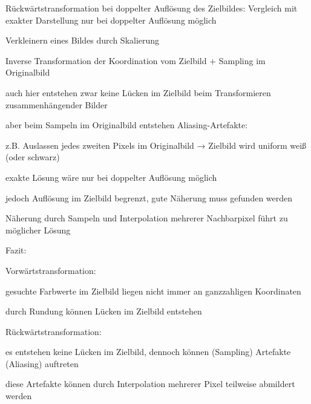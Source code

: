 \documentclass[landscape]{article}
\begin{document}
\begin{multicols}{3}
  
  Rückwärtstransformation bei doppelter Auflösung des Zielbildes: Vergleich mit exakter Darstellung nur bei doppelter Auflösung möglich
  
  Verkleinern eines Bildes durch Skalierung
  \begin{itemize*}
    \item Inverse Transformation der Koordination vom Zielbild + Sampling im Originalbild
          \begin{itemize*}
            \item auch hier entstehen zwar keine Lücken im Zielbild beim Transformieren zusammenhängender Bilder
            \item aber beim Sampeln im Originalbild entstehen Aliasing-Artefakte:
            \item z.B. Auslassen jedes zweiten Pixels im Originalbild → Zielbild wird uniform weiß (oder schwarz)
          \end{itemize*}
    \item exakte Lösung wäre nur bei doppelter Auflösung möglich
    \item jedoch Auflösung im Zielbild begrenzt, gute Näherung muss gefunden werden
    \item Näherung durch Sampeln und Interpolation mehrerer Nachbarpixel führt zu möglicher Lösung
  \end{itemize*}
  
  
  Fazit:
  \begin{itemize*}
    \item Vorwärtstransformation:
          \begin{itemize*}
            \item gesuchte Farbwerte im Zielbild liegen nicht immer an ganzzahligen Koordinaten
            \item durch Rundung können Lücken im Zielbild entstehen
          \end{itemize*}
    \item Rückwärtstransformation:
          \begin{itemize*}
            \item es entstehen keine Lücken im Zielbild, dennoch können (Sampling) Artefakte (Aliasing) auftreten
            \item diese Artefakte können durch Interpolation mehrerer Pixel teilweise abmildert werden
          \end{itemize*}
  \end{itemize*}
  

\end{multicols}
\end{document}
